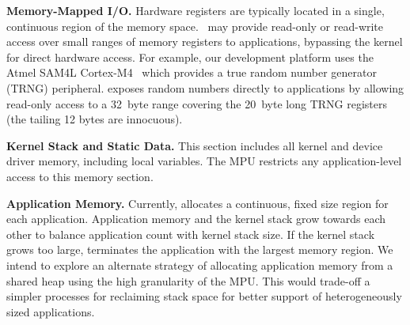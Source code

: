 {\bf Memory-Mapped I/O.}
Hardware registers are typically located in a single, continuous region of the
memory space.~
\name may provide read-only or read-write access over small ranges of memory
registers to applications, bypassing the kernel for direct hardware access.
For example, our development platform uses the Atmel SAM4L Cortex-M4~\cite{sam4l} which
provides a true random number generator (TRNG) peripheral.
\name exposes random
numbers directly to applications by allowing read-only access to a 32~byte
range covering the 20~byte long TRNG registers (the tailing 12 bytes are innocuous).

{\bf Kernel Stack and Static Data.}
This section includes all kernel and device driver memory, including local
variables. The MPU restricts any application-level access to this memory section.

{\bf Application Memory.}
Currently, \name allocates a continuous, fixed size region for each
application.
Application memory and the kernel stack grow towards each other to balance
application count with kernel stack size. If the kernel stack
grows too large, \name terminates the application with the
largest memory region. We intend to explore an alternate strategy of
allocating application memory from a shared heap using the
high granularity of the MPU.
This would trade-off
a simpler processes for reclaiming stack space
for better support of heterogeneously sized applications.


